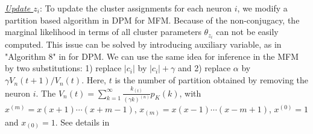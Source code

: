 \documentclass{article}
\begin{document}
	\underline{\textit{Update $z_i$}}: To update the cluster assignments for each neuron $i$, we modify a partition based algorithm in DPM for MFM. Because of the non-conjugacy, the marginal likelihood in terms of all cluster parameters $\theta_{z_i}$ can not be easily computed. This issue can be solved by introducing auxiliary variable, as in "Algorithm 8" in \cite{Neal2000} for DPM. We can use the same idea for inference in the MFM by two substitutions: 1) replace $|c_i|$ by $|c_i| + \gamma$ and 2) replace $\alpha$ by $\gamma V_n(t+1)/ V_n(t)$. Here, $t$ is the number of partition obtained by removing the neuron $i$. The $V_n(t) = \sum_{k=1}^{\infty}\frac{k_{(t)}}{(\gamma k)^{(n)}}p_K(k)$, with $x^{(m)} = x(x+1)\cdots(x+m-1)$, $x_{(m)} = x(x-1)\cdots(x-m+1)$, $x^{(0)} = 1$ and $x_{(0)} = 1$. See details in \cite{Miller2018}
	
	
	
	
	
	
	
	
	
	
\end{document}
